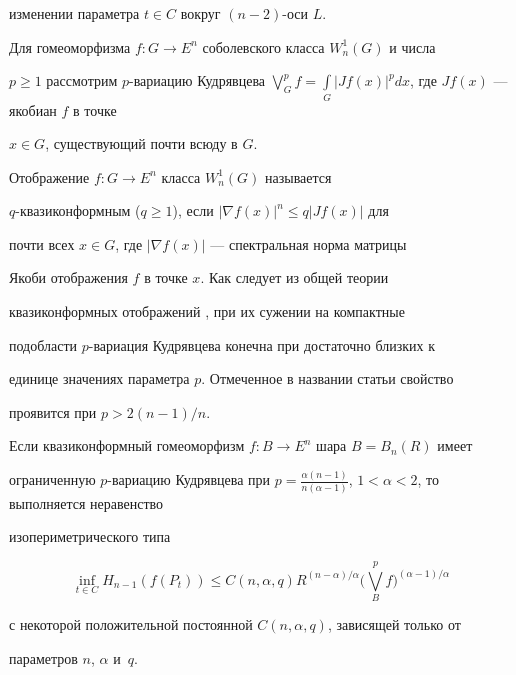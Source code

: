 изменении параметра $t\in C$ вокруг $(n-2)$-оси $L$. 


 


Для гомеоморфизма $f:G\to E^n$ соболевского класса $W^1_n(G)$ и числа 


$p\ge1$ рассмотрим $p$-вариацию Кудрявцева \cite{1} $\bigvee\limits^p_G 


f=\int\limits_G|J f(x)|^p dx$, где $J f(x)$ --- якобиан $f$ в точке 


$x\in G$, существующий почти всюду в $G$. 


 


Отображение $f:G\to E^n$ класса $W^1_n(G)$ называется 


$q$-квазиконформным ($q\ge1$), если $|\nabla f(x)|^n\le q|J f(x)|$ для 


почти всех $x\in G$, где $|\nabla f(x)|$ --- спектральная норма матрицы 


Якоби отображения $f$ в точке $x$. Как следует из общей теории 


квазиконформных отображений \cite{2}, при их сужении на компактные 


подобласти $p$-вариация Кудрявцева конечна при достаточно близких к 


единице значениях параметра $p$. Отмеченное в названии статьи свойство 


проявится при $p>2(n-1)/n$. 


 


\begin{thm} 


Если квазиконформный гомеоморфизм $f:B\to E^n$ шара $B=B_n(R)$ имеет 


ограниченную $p$-вариацию Кудрявцева при $p=\frac{\alpha(n-


1)}{n(\alpha-1)}$, $1<\alpha<2$, то выполняется неравенство 


изопериметрического типа 


$$ 


\inf_{t\in C}H_{n-1}(f(P_t))\le C(n,\alpha,q) 


R^{(n-\alpha)/\alpha}\Big(\bigvee^p_B f\Big)^{(\alpha-1)/\alpha} 


$$ 


с некоторой положительной постоянной $C(n,\alpha,q)$, зависящей только от 


параметров $n$, $\alpha$ и~$q$. 


\end{thm} 


